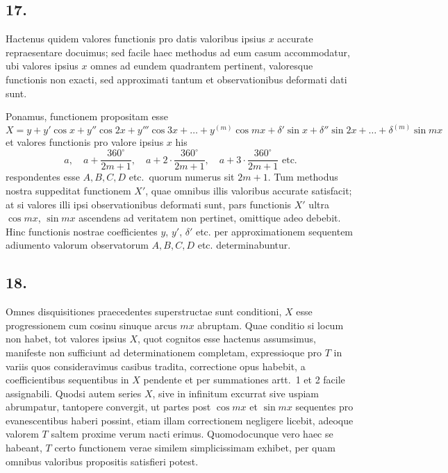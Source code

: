 \documentclass[12pt,a4paper]{article}
\theoremstyle{plain}
\begin{document}
\subsection*{17.}

Hactenus quidem valores functionis pro datis valoribus ipsius $x$ accurate repraesentare docuimus; sed facile haec methodus ad eum casum accommodatur,
ubi valores ipsius $x$ omnes ad eundem quadrantem pertinent, valoresque functionis non exacti, sed approximati tantum et observationibus deformati dati sunt.

Ponamus, functionem propositam esse
\[
X = y + y'\cos x + y''\cos 2x + y'''\cos 3x + \ldots + y^{(m)}\cos mx + \delta'\sin x + \delta''\sin 2x + \ldots + \delta^{(m)}\sin mx
\]
et valores functionis pro valore ipsius $x$ his
\[
a,\quad a + \frac{360^{\circ}}{2m+1},\quad a + 2\cdot\frac{360^{\circ}}{2m+1},\quad a + 3\cdot\frac{360^{\circ}}{2m+1}\text{ etc.}
\]
respondentes esse $A, B, C, D$ etc.\, quorum numerus sit $2m+1$. Tum methodus nostra suppeditat functionem $X'$, quae omnibus illis valoribus accurate satisfacit;
at si valores illi ipsi observationibus deformati sunt, pars functionis $X'$ ultra
$\cos mx$, $\sin mx$ ascendens ad veritatem non pertinet, omittique adeo debebit. Hinc functionis nostrae coefficientes $y$, $y'$, $\delta'$ etc. per approximationem
sequentem adiumento valorum observatorum $A, B, C, D$ etc. determinabuntur.

\subsection*{18.}

Omnes disquisitiones praecedentes superstructae sunt conditioni, $X$ esse progressionem cum cosinu sinuque arcus $mx$ abruptam. Quae conditio si locum non
habet, tot valores ipsius $X$, quot cognitos esse hactenus assumsimus, manifeste non sufficiunt ad determinationem completam, expressioque pro $T$ in variis quos
consideravimus casibus tradita, correctione opus habebit, a coefficientibus sequentibus in $X$ pendente et per summationes artt.\ 1 et 2 facile assignabili. Quodsi autem
series $X$, sive in infinitum excurrat sive uspiam abrumpatur, tantopere convergit, ut partes post $\cos mx$ et $\sin mx$ sequentes pro evanescentibus haberi possint,
etiam illam correctionem negligere licebit, adeoque valorem $T$ saltem proxime verum nacti erimus. Quomodocunque vero haec se habeant, $T$ certo functionem verae
similem simplicissimam exhibet, per quam omnibus valoribus propositis satisfieri potest.
\end{document}
